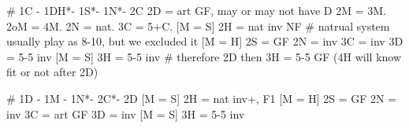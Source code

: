 # 1C - 1DH*- 1S*- 1N*- 2C
2D = art GF, may or may not have D
    2M = 3M. 2oM = 4M. 2N = nat. 3C = 5+C.
[M = S] 2H = nat inv NF  # natrual system usually play as 8-10, but we excluded it
[M = H] 2S = GF
2N = inv
3C = inv
3D = 5-5 inv
[M = S] 3H = 5-5 inv  # therefore 2D then 3H = 5-5 GF (4H will know fit or not after 2D)

# 1D - 1M - 1N*- 2C*- 2D
[M = S] 2H = nat inv+, F1
[M = H] 2S = GF
2N = inv
3C = art GF
3D = inv
[M = S] 3H = 5-5 inv